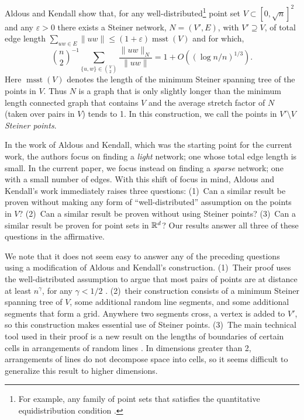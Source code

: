 \documentclass{patmorin}
\DeclareMathOperator{\msst}{msst}
\newcommand{\eps}{\varepsilon}
\begin{document}
Aldous and Kendall \cite[Section~5.3]{aldous.kendall:short-length}
show that, for any well-distributed\footnote{For example, any
family of point sets that satisfies the quantitative equidistribution
condition \cite[Definition~3]{aldous.kendall:short-length}.} point set
$V\subset[0,\sqrt{n}]^2$ and any $\eps > 0$ there exists a Steiner
network, $N=(V',E)$, with $V'\supseteq V$, of total edge length
$\sum_{uw\in E}\|uw\| \le (1+\eps)\msst(V)$ and for which,
\[
    \binom{n}{2}^{-1}\sum_{\{u,w\}\in \binom{V}{2}}\frac{\|uw\|_N}{\|uw\|} = 1 + O((\log n/n)^{1/3}) .
\]
Here $\msst(V)$ denotes the length of the minimum Steiner spanning tree
of the points in $V$.  Thus $N$ is a graph that is only slightly longer
than the minimum length connected graph that contains $V$ and the average
stretch factor of $N$ (taken over pairs in $V$) tends to 1.  In this
construction, we call the points in $V'\setminus V$ \emph{Steiner points}.

In the work of Aldous and Kendall, which was the starting point for
the current work, the authors focus on finding a \emph{light} network;
one whose total edge length is small.  In the current paper, we focus
instead on finding a \emph{sparse} network; one with a small number
of edges.  With this shift of focus in mind, Aldous and Kendall's
work immediately raises three questions: (1)~Can a similar result be
proven without making any form of ``well-distributed'' assumption on the
points in $V$? (2)~Can a similar result be proven without using Steiner
points? (3)~Can a similar result be proven for point sets in $\mathbb{R}^d$?
Our results answer all three of these questions in the affirmative.

We note that it does not seem easy to answer any of the preceding
questions using a modification of Aldous and Kendall's construction.
(1)~Their proof uses the well-distributed assumption to argue that
most pairs of points are at distance at least $n^{\gamma}$, for any
$\gamma<1/2$ \cite[Section~5.3]{aldous.kendall:short-length}.  (2)~their
construction consists of a minimum Steiner spanning tree of $V$,
some additional random line segments, and some additional segments
that form a grid.  Anywhere two segments cross, a vertex is added
to $V'$, so this construction makes essential use of Steiner points.
(3)~The main technical tool used in their proof is a new result on the
lengths of boundaries of certain cells in arrangements of random lines
\cite[Theorems~3 and 4]{aldous.kendall:short-length}.  In dimensions
greater than 2, arrangements of lines do not decompose space into cells,
so it seems difficult to generalize this result to higher dimensions.
\end{document}
